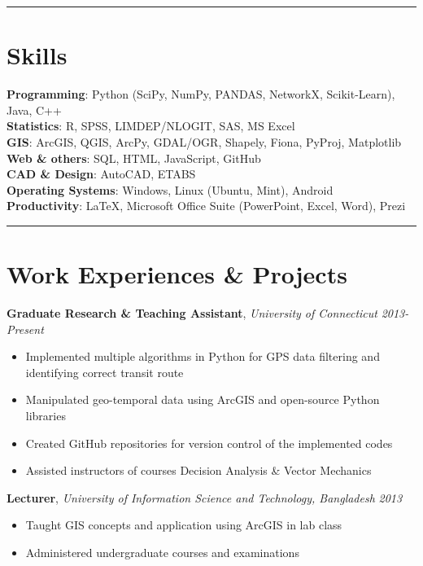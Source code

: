 \documentclass[margin]{res}%
\begin{document}
\begin{resume}
\vspace{-1.9em}
\noindent\rule{\textwidth}{0.4pt}
\vspace{-1.85em}

\section{Skills}
{\bf Programming}: Python (SciPy, NumPy, PANDAS, NetworkX, Scikit-Learn), Java, C++\\
{\bf Statistics}: R, SPSS, LIMDEP/NLOGIT, SAS, MS Excel\\
{\bf GIS}: ArcGIS, QGIS, ArcPy, GDAL/OGR, Shapely, Fiona, PyProj, Matplotlib \\
{\bf Web \& others}: SQL, HTML, JavaScript, GitHub\\
{\bf CAD \& Design}: AutoCAD, ETABS\\ 
{\bf Operating Systems}: Windows, Linux (Ubuntu, Mint), Android\\
{\bf Productivity}: \LaTeX,  Microsoft Office Suite (PowerPoint, Excel, Word), Prezi


\vspace{-1.9em}
\noindent\rule{\textwidth}{0.4pt}
\vspace{-1.85em}

\section{Work Experiences \& Projects}
{\bf Graduate Research \& Teaching Assistant}, \emph{University of Connecticut} \hfill \emph{2013-Present}
	 \begin{itemize} \itemsep -2.25pt  %
	\item Implemented multiple algorithms in Python for GPS data filtering and\\ identifying
correct transit route
	\item Manipulated geo-temporal data using ArcGIS and open-source Python libraries
	\item Created GitHub repositories for version control of the implemented codes
	 \item Assisted instructors of courses Decision Analysis \& Vector Mechanics
	 \end {itemize}
	\vspace{-0.85em}

{\bf Lecturer}, \emph{University of Information Science and Technology, Bangladesh} \hfill \emph{2013}
\begin{itemize} \itemsep -2.25pt
	\item Taught GIS concepts and application using ArcGIS in lab class
	\item Administered undergraduate courses and examinations
	\end{itemize}
	\vspace{-0.85em}


\end{resume}
\end{document}
